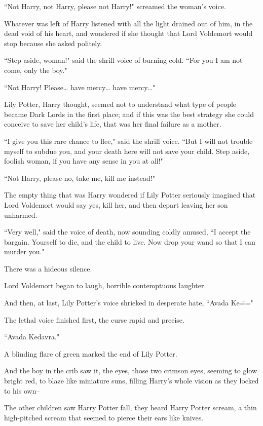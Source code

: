 \begin{em}
``Not Harry, not Harry, please not Harry!" screamed the woman's voice.

Whatever was left of Harry listened with all the light drained out of him, in the dead void of his heart, and wondered if she thought that Lord Voldemort would stop because she asked politely.

``Step aside, woman!" said the shrill voice of burning cold. ``For you I am not come, only the boy."

``Not Harry! Please{\ldots} have mercy{\ldots} have mercy{\ldots}"

Lily Potter, Harry thought, seemed not to understand what type of people became Dark Lords in the first place; and if this was the best strategy she could conceive to save her child's life, that was her final failure as a mother.

``I give you this rare chance to flee," said the shrill voice. ``But I will not trouble myself to subdue you, and your death here will not save your child. Step aside, foolish woman, if you have any sense in you at all!"

``Not Harry, please no, take me, kill me instead!"

The empty thing that was Harry wondered if Lily Potter seriously imagined that Lord Voldemort would say yes, kill her, and then depart leaving her son unharmed.

``Very well," said the voice of death, now sounding coldly amused, ``I accept the bargain. Yourself to die, and the child to live. Now drop your wand so that I can murder you."

There was a hideous silence.

Lord Voldemort began to laugh, horrible contemptuous laughter.

And then, at last, Lily Potter's voice shrieked in desperate hate, ``Avada Ke\==="

The lethal voice finished first, the curse rapid and precise.

``Avada Kedavra."

A blinding flare of green marked the end of Lily Potter.

And the boy in the crib saw it, the eyes, those two crimson eyes, seeming to glow bright red, to blaze like miniature suns, filling Harry's whole vision as they locked to his own\---
\end{em}

\later

The other children saw Harry Potter fall, they heard Harry Potter scream, a thin high-pitched scream that seemed to pierce their ears like knives.

